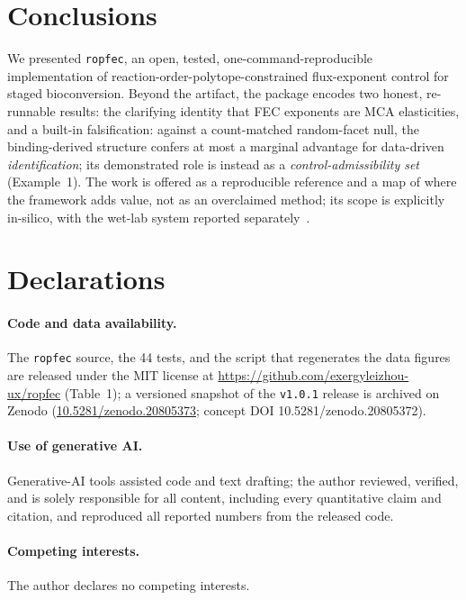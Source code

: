 \documentclass[11pt]{article}
\begin{document}
\section{Conclusions}
We presented \texttt{ropfec}, an open, tested, one-command-reproducible implementation of
reaction-order-polytope-constrained flux-exponent control for staged bioconversion. Beyond
the artifact, the package encodes two honest, re-runnable results: the clarifying identity
that FEC exponents are MCA elasticities, and a built-in falsification: against a count-matched random-facet null, the binding-derived
structure confers at most a marginal advantage for data-driven \emph{identification}; its
demonstrated role is instead as a \emph{control-admissibility set} (Example~1). The
work is offered as a reproducible reference and a map of where the framework adds
value, not as an overclaimed method; its scope is explicitly in-silico, with the wet-lab
system reported separately~\citep{paperA}.

\section*{Declarations}
\paragraph{Code and data availability.} The \texttt{ropfec} source, the 44 tests, and the
script that regenerates the data figures are released under the MIT license at
\url{https://github.com/exergyleizhou-ux/ropfec} (Table~1); a versioned snapshot
of the \texttt{v1.0.1} release is archived on Zenodo (\href{https://doi.org/10.5281/zenodo.20805373}{10.5281/zenodo.20805373}; concept DOI 10.5281/zenodo.20805372).
\paragraph{Use of generative AI.} Generative-AI tools assisted code and text drafting; the
author reviewed, verified, and is solely responsible for all content, including every
quantitative claim and citation, and reproduced all reported numbers from the released code.
\paragraph{Competing interests.} The author declares no competing interests.
\end{document}
